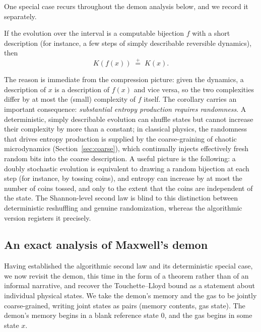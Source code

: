 \documentclass[11pt]{article}
\newcommand{\peq}{\mathrel{\stackrel{+}{=}}}
\begin{document}
One special case recurs throughout the demon analysis below, and we record it separately.

\begin{corollary}
\label{cor:deterministic}
If the evolution over the interval is a computable bijection $f$ with a short description (for instance, a few steps of simply describable reversible dynamics), then
\[
K(f(x)) \;\peq\; K(x).
\]
\end{corollary}

The reason is immediate from the compression picture: given the dynamics, a description of $x$ is a description of $f(x)$ and vice versa, so the two complexities differ by at most the (small) complexity of $f$ itself. The corollary carries an important consequence: \emph{substantial entropy production requires randomness}. A deterministic, simply describable evolution can shuffle states but cannot increase their complexity by more than a constant; in classical physics, the randomness that drives entropy production is supplied by the coarse-graining of chaotic microdynamics (Section~\ref{sec:coarse}), which continually injects effectively fresh random bits into the coarse description. A useful picture is the following: a doubly stochastic evolution is equivalent to drawing a random bijection at each step (for instance, by tossing coins), and entropy can increase by at most the number of coins tossed, and only to the extent that the coins are independent of the state. The Shannon-level second law is blind to this distinction between deterministic reshuffling and genuine randomization, whereas the algorithmic version registers it precisely.

\subsection{An exact analysis of Maxwell's demon}
\label{sec:demon}

Having established the algorithmic second law and its deterministic special case, we now revisit the demon, this time in the form of a theorem rather than of an informal narrative, and recover the Touchette--Lloyd bound as a statement about individual physical states. We take the demon's memory and the gas to be jointly coarse-grained, writing joint states as pairs (memory contents, gas state). The demon's memory begins in a blank reference state $0$, and the gas begins in some state $x$.
\end{document}
